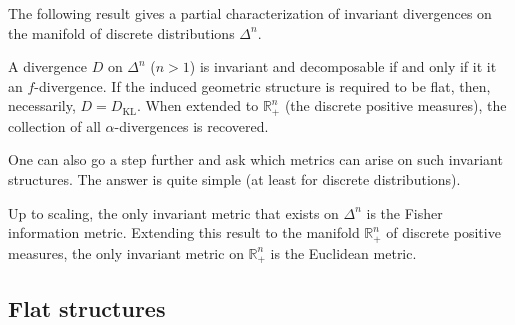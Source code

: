     The following result gives a partial characterization of invariant divergences on the manifold of discrete distributions $\Delta^n$.
    \begin{property}
        A divergence $D$ on $\Delta^n$ ($n>1$) is invariant and decomposable if and only if it it an $f$-divergence. If the induced geometric structure is required to be flat, then, necessarily, $D=D_{\text{KL}}$. When extended to $\mathbb{R}^n_+$ (the discrete positive measures), the collection of all $\alpha$-divergences is recovered.
    \end{property}

    One can also go a step further and ask which metrics can arise on such invariant structures. The answer is quite simple (at least for discrete distributions).
    \begin{theorem}[Chentsov]
        Up to scaling, the only invariant metric that exists on $\Delta^n$ is the Fisher information metric. Extending this result to the manifold $\mathbb{R}^n_+$ of discrete positive measures, the only invariant metric on $\mathbb{R}^n_+$ is the Euclidean metric.
    \end{theorem}

\subsection{Flat structures}

